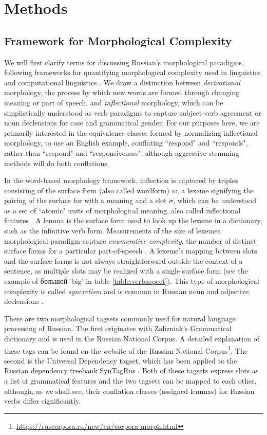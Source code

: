 \documentclass[11pt,a4paper]{article}
\begin{document}
\section{Methods}
\subsection{Framework for Morphological Complexity}
We will first clarify terms for discussing Russian's morphological paradigms, following frameworks for quantifying morphological complexity used in linguistics and computational linguistics \cite{baerman2015intro, cotterell-etal-2019-complexity}. We draw a distinction between \textit{derivational} morphology, the process by which new words are formed through changing meaning or part of speech, and \textit{inflectional} morphology, which can be simplistically understood as verb paradigms to capture subject-verb agreement or noun declensions for case and grammatical gender. For our purposes here, we are primarily interested in the equivalence classes formed by normalizing inflectional morphology, to use an English example, conflating ``respond" and ``responds", rather than ``respond" and ``responsiveness", although aggressive stemming methods will do both conflations.

In the word-based morphology framework, inflection is captured by triples consisting of the surface form (also called wordform) $w$, a lexeme  signifying the pairing of the surface for with a meaning and a slot $\sigma$, which can be understood as a set of ``atomic" units of morphological meaning, also called inflectional features \cite{aronoff1976word,sylak-glassman-etal-2015-language,cotterell-etal-2019-complexity}.
A lemma is the surface form used to look up the lexeme in a dictionary, such as the infinitive verb form. Measurements of the size of lexemes morphological paradigm capture \textit{enumerative complexity}, the number of distinct surface forms for a particular part-of-speech \cite{cotterell-etal-2019-complexity}. A lexeme's mapping between slots and the surface forms is not always straightforward outside the context of a sentence, as multiple slots may be realized with a single surface form (see the example of \foreignlanguage{russian}{большой} 'big' in table \ref{table:verbaspect}). This type of morphological complexity is called \textit{syncretism} and is common in Russian noun and adjective declensions \cite{baerman2015understanding,Milizia2015PatternsOS}.

There are two morphological tagsets commonly used for natural language processing of Russian. The first originates with Zalizniak's Grammatical dictionary and is used in the Russian National Corpus. A detailed explanation of these tags can be found on the website of the Russian National Corpus\footnote{\url{https://ruscorpora.ru/new/en/corpora-morph.html}}. The second is the Universal Dependency tagset, which has been applied to the Russian dependency treebank SynTagRus \cite{Sharoff2011ThePP,lipenkova-soucek-2014-converting,mcdonald-etal-2013-universal}. Both of these tagsets express slots as a list of grammatical features and the two tagsets can be mapped to each other, although, as we shall see, their conflation classes (assigned lemmas) for Russian verbs differ significantly.
\end{document}
